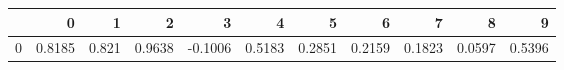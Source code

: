 \begin{tabular}{lrrrrrrrrrr}
\toprule
{} &       0 &      1 &       2 &       3 &       4 &       5 &       6 &       7 &       8 &       9 \\
\midrule
0 &  0.8185 &  0.821 &  0.9638 & -0.1006 &  0.5183 &  0.2851 &  0.2159 &  0.1823 &  0.0597 &  0.5396 \\
\bottomrule
\end{tabular}
